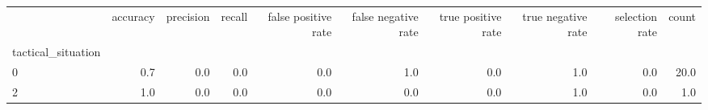 \begin{tabular}{lrrrrrrrrr}
\toprule
{} &  accuracy &  precision &  recall &  false positive rate &  false negative rate &  true positive rate &  true negative rate &  selection rate &  count \\
tactical\_situation &           &            &         &                      &                      &                     &                     &                 &        \\
\midrule
0                  &       0.7 &        0.0 &     0.0 &                  0.0 &                  1.0 &                 0.0 &                 1.0 &             0.0 &   20.0 \\
2                  &       1.0 &        0.0 &     0.0 &                  0.0 &                  0.0 &                 0.0 &                 1.0 &             0.0 &    1.0 \\
\bottomrule
\end{tabular}
